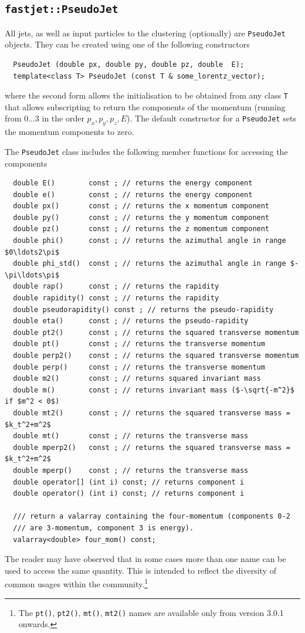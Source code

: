 \documentclass[12pt,a4]{article}
\newcommand{\ttt}[1]{{\small\texttt{#1}}}
\newcommand{\PJ}{\ttt{PseudoJet}\xspace}
\begin{document}
\subsection{\tt fastjet::PseudoJet}
\label{sec:PseudoJet}


All jets, as well as input particles to the clustering (optionally)
are \ttt{PseudoJet} objects.  They can be created using one of the
following constructors
\begin{lstlisting}
  PseudoJet (double px, double py, double pz, double  E);
  template<class T> PseudoJet (const T & some_lorentz_vector);
\end{lstlisting}
where the second form allows the initialisation to be obtained from
any class \ttt{T} that allows subscripting to return the components of
the momentum (running from $0\ldots3$ in the order $p_x,p_y,p_z,E$).
The default constructor for a \PJ sets the momentum components to
zero.

The \ttt{PseudoJet} class includes the following member functions for
accessing the components
{
\begin{lstlisting}
  double E()        const ; // returns the energy component
  double e()        const ; // returns the energy component
  double px()       const ; // returns the x momentum component
  double py()       const ; // returns the y momentum component
  double pz()       const ; // returns the z momentum component
  double phi()      const ; // returns the azimuthal angle in range $0\ldots2\pi$
  double phi_std()  const ; // returns the azimuthal angle in range $-\pi\ldots\pi$
  double rap()      const ; // returns the rapidity
  double rapidity() const ; // returns the rapidity
  double pseudorapidity() const ; // returns the pseudo-rapidity
  double eta()      const ; // returns the pseudo-rapidity
  double pt2()      const ; // returns the squared transverse momentum
  double pt()       const ; // returns the transverse momentum
  double perp2()    const ; // returns the squared transverse momentum
  double perp()     const ; // returns the transverse momentum
  double m2()       const ; // returns squared invariant mass
  double m()        const ; // returns invariant mass ($-\sqrt{-m^2}$ if $m^2 < 0$)
  double mt2()      const ; // returns the squared transverse mass = $k_t^2+m^2$
  double mt()       const ; // returns the transverse mass
  double mperp2()   const ; // returns the squared transverse mass = $k_t^2+m^2$
  double mperp()    const ; // returns the transverse mass
  double operator[] (int i) const; // returns component i
  double operator() (int i) const; // returns component i

  /// return a valarray containing the four-momentum (components 0-2
  /// are 3-momentum, component 3 is energy).
  valarray<double> four_mom() const;
\end{lstlisting}} 
%
\noindent The reader may have observed that in some cases more than
one name can be used to access the same quantity. This is intended to
reflect the diversity of common usages within the
community.\footnote{The \texttt{pt()}, \texttt{pt2()}, \texttt{mt()},
  \texttt{mt2()} names are available only from version 3.0.1 onwards.}
\end{document}
